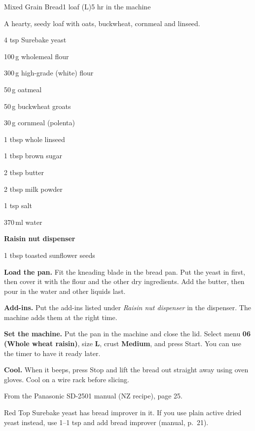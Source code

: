 \begin{recipebox}{Mixed Grain Bread}{1 loaf (L)}{5 hr in the machine}

A hearty, seedy loaf with oats, buckwheat, cornmeal and linseed.

\begin{ingredients}
  \item 4 tsp Surebake yeast
  \item 100\,g wholemeal flour
  \item 300\,g high-grade (white) flour
  \item 50\,g oatmeal
  \item 50\,g buckwheat groats
  \item 30\,g cornmeal (polenta)
  \item 1 tbsp whole linseed
  \item 1 tbsp brown sugar
  \item 2 tbsp butter
  \item 2 tbsp milk powder
  \item 1 tsp salt
  \item 370\,ml water
  \item[] \textbf{Raisin nut dispenser}
  \item 1 tbsp toasted sunflower seeds
\end{ingredients}

\begin{method}
  \item \textbf{Load the pan.} Fit the kneading blade in the bread pan. Put the yeast in first, then cover it with the flour and the other dry ingredients. Add the butter, then pour in the water and other liquids last.
  \item \textbf{Add-ins.} Put the add-ins listed under \emph{Raisin nut dispenser} in the dispenser. The machine adds them at the right time.
  \item \textbf{Set the machine.} Put the pan in the machine and close the lid. Select menu \textbf{06 (Whole wheat raisin)}, size \textbf{L}, crust \textbf{Medium}, and press Start. You can use the timer to have it ready later.
  \item \textbf{Cool.} When it beeps, press Stop and lift the bread out straight away using oven gloves. Cool on a wire rack before slicing.
\end{method}

\begin{notelist}
  \item From the Panasonic SD-2501 manual (NZ recipe), page 25.
  \item Red Top Surebake yeast has bread improver in it. If you use plain active dried yeast instead, use 1--1 tsp and add bread improver (manual, p.~21).
\end{notelist}

\end{recipebox}
